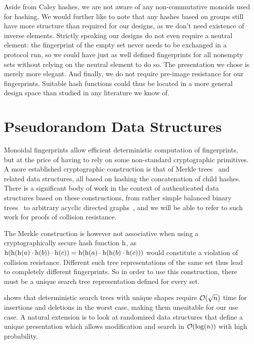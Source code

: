 Aside from Caley hashes, we are not aware of any non-commutative monoids used for hashing. We would further like to note that any hashes based on groups still have more structure than required for our designs, as we don't need existence of inverse elements. Strictly speaking our designs do not even require a neutral element: the fingerprint of the empty set never needs to be exchanged in a protocol run, so we could have just as well defined fingerprints for all nonempty sets without relying on the neutral element to do so. The presentation we chose is merely more elegant. And finally, we do not require pre-image resistance for our fingerprints. Suitable hash functions could thus be located in a more general design space than studied in any literature we know of.

\section{Pseudorandom Data Structures}
\label{randomization}

Monoidal fingerprints allow efficient deterministic computation of fingerprints, but at the price of having to rely on some non-standard cryptographic primitives. A more established cryptographic construction is that of Merkle trees~\cite{merkle1989certified} and related data structures, all based on hashing the concatenation of child hashes. There is a significant body of work in the context of authenticated data structures based on these constructions, from rather simple balanced binary trees~\cite{naor2000certificate} to arbitrary acyclic directed graphs~\cite{martel2004general}, and we will be able to refer to such work for proofs of collision resistance.

The Merkle construction is however not associative when using a cryptographically secure hash function $\operatorname{h}$, as $\operatorname{h}(\operatorname{h}(\operatorname{h}(a) \cdot \operatorname{h}(b)) \cdot \operatorname{h}(c)) = \operatorname{h}(\operatorname{h}(a) \cdot \operatorname{h}(\operatorname{h}(b) \cdot \operatorname{h}(c)))$ would constitute a violation of collision resistance. Different such tree representations of the same set thus lead to completely different fingerprints. So in order to use this construction, there must be a unique search tree representation defined for every set.

\cite{uniquerepresentation} shows that deterministic search trees with unique shapes require $\mathcal{O}(\sqrt{n})$ time for insertions and deletions in the worst case, making them unsuitable for our use case. A natural extension is to look at randomized data structures that define a unique presentation which allows modification and search in $\mathcal{O}(\log(n))$ with high probability.

